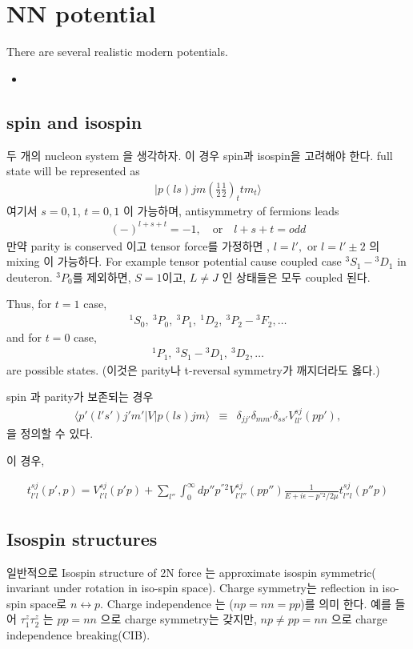 \documentclass[10pt]{book}
\newcommand{\bea}{\begin{eqnarray}}
\newcommand{\eea}{\end{eqnarray}}
\def\la{\langle}
\def\ra{\rangle}
\begin{document}
\section{NN potential}

There are several realistic modern potentials. 
\begin{itemize}
\item 
\end{itemize}

 
\subsection{spin and isospin}
두 개의 nucleon system 을 생각하자. 이 경우 spin과 isospin을 고려해야 한다.
full state will be represented as
\bea
|p(ls)jm(\frac{1}{2}\frac{1}{2})_t t m_t\ra              
\eea
여기서 $s=0,1$, $t=0,1$ 이 가능하며, antisymmetry of fermions leads
\bea
(-)^{l+s+t}=-1,\quad\mbox{or}\quad l+s+t=odd
\eea 
만약 parity is conserved 이고 tensor force를 가정하면 ,  
$l=l',\mbox{  or  } l=l'\pm 2 $ 의 mixing 이 가능하다.
For example tensor potential cause coupled case ${}^3S_1-{}^3D_1$ in deuteron. $^3P_0$를 제외하면, 
$S=1$이고, $L\neq J$ 인 상태들은 모두 coupled 된다. 

Thus, for $t=1$ case,
\bea
{}^1S_0,\ {}^3P_0,\ {}^3P_1,\ {}^1D_2,\ {}^3P_2-{}^3F_2,\dots
\eea
and for $t=0$ case,
\bea
{}^1P_1,\ {}^3S_1-{}^3D_1,\ {}^3 D_2,\dots
\eea
are possible states. (이것은 parity나 t-reversal symmetry가 깨지더라도 옳다.)

spin 과 parity가 보존되는 경우 
\bea
\la p'(l's')j'm'|V|p(ls)jm\ra&\equiv&
\delta_{jj'}\delta_{mm'}\delta_{ss'}
V^{sj}_{ll'}(pp'), 
\eea
을 정의할 수 있다. 

이 경우,

\bea
t^{sj}_{l'l}(p',p)=V^{sj}_{l'l}(p'p)+\sum_{l''}\int_0^\infty dp'' p^{''2} V^{sj}_{l'l''}(pp'')
                       \frac{1}{E+i\epsilon-p^{''2}/2\mu}t^{sj}_{l''l}(p'' p)
\eea

\subsection{Isospin structures}
일반적으로 Isospin structure of 2N force 는 approximate
isospin symmetric( invariant under rotation in iso-spin space).
Charge symmetry는 reflection in iso-spin space로 
$n\leftrightarrow p$. Charge independence 는 
($np=nn=pp$)를 의미 한다. 예를 들어 $\tau_1^z\tau_2^z$ 는 
$pp=nn$ 으로 charge symmetry는 갖지만, $np\neq pp=nn$ 으로 
charge independence breaking(CIB).
\end{document}
